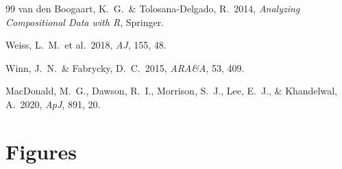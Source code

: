 \documentclass[12pt,a4paper]{article}
\begin{document}
\begin{thebibliography}{99}
van den Boogaart, K.~G.\ \& Tolosana-Delgado, R.\ 2014,
\textit{Analyzing Compositional Data with R}, Springer.

Weiss, L.~M.\ et al.\ 2018, \textit{AJ}, 155, 48.

Winn, J.~N.\ \& Fabrycky, D.~C.\ 2015, \textit{ARA\&A}, 53, 409.

MacDonald, M.~G., Dawson, R.~I., Morrison, S.~J., Lee, E.~J., \&
Khandelwal, A.\ 2020, \textit{ApJ}, 891, 20.

\end{thebibliography}

\appendix
\section{Figures}
\label{app:figs}
\end{document}

